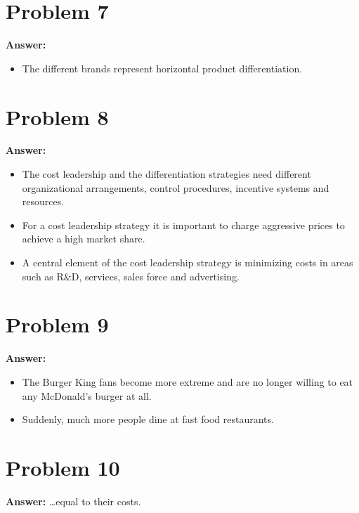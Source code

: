 \documentclass[11pt]{article}
\begin{document}
\section*{Problem 7}
\label{sec:orgccf1a8b}

\textbf{Answer:}
\begin{itemize}
\item The different brands represent horizontal product differentiation.
\end{itemize}
\section*{Problem 8}
\label{sec:orgb6c43f7}

\textbf{Answer:}
\begin{itemize}
\item The cost leadership and the differentiation strategies need different
organizational arrangements, control procedures, incentive systems and
resources.
\item For a cost leadership strategy it is important to charge aggressive
prices to achieve a high market share.
\item A central element of the cost leadership strategy is minimizing costs in
areas such as R\&D, services, sales force and advertising.
\end{itemize}
\section*{Problem 9}
\label{sec:org1d705ed}

\textbf{Answer:}
\begin{itemize}
\item The Burger King fans become more extreme and are no longer willing to eat
any McDonald's burger at all.
\item Suddenly, much more people dine at fast food restaurants.
\end{itemize}
\section*{Problem 10}
\label{sec:orge63389c}

\textbf{Answer:} \ldots{}equal to their costs.
\end{document}
